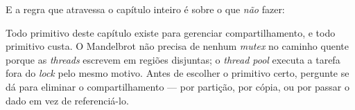 E a regra que atravessa o capítulo inteiro é sobre o que \emph{não} fazer:
\begin{regra}
Todo primitivo deste capítulo existe para gerenciar compartilhamento, e todo
primitivo custa. O Mandelbrot não precisa de nenhum \emph{mutex} no caminho
quente porque as \emph{threads} escrevem em regiões disjuntas; o \emph{thread
pool} executa a tarefa fora do \emph{lock} pelo mesmo motivo. Antes de escolher
o primitivo certo, pergunte se dá para eliminar o compartilhamento --- por
partição, por cópia, ou por passar o dado em vez de referenciá-lo.
\end{regra}
